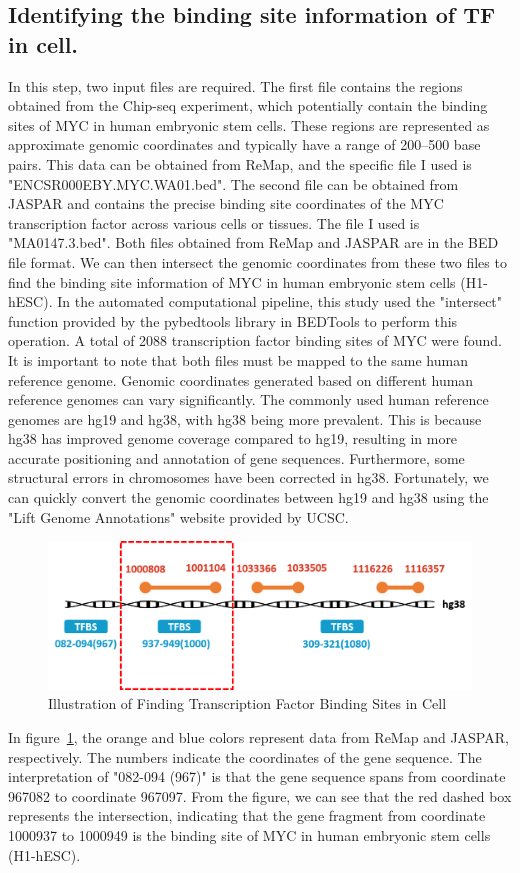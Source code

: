 \documentclass{PHlab-thesis}
\begin{document}
\subsection[Finding TFBSs]{Identifying the binding site information of TF in cell.}
In this step, two input files are required. The first file contains the regions obtained from the Chip-seq experiment, which potentially contain the binding sites of MYC in human embryonic stem cells. These regions are represented as approximate genomic coordinates and typically have a range of 200--500 base pairs. This data can be obtained from ReMap, and the specific file I used is "ENCSR000EBY.MYC.WA01.bed". The second file can be obtained from JASPAR and contains the precise binding site coordinates of the MYC transcription factor across various cells or tissues. The file I used is "MA0147.3.bed". Both files obtained from ReMap and JASPAR are in the BED file format. We can then intersect the genomic coordinates from these two files to find the binding site information of MYC in human embryonic stem cells (H1-hESC). In the automated computational pipeline, this study used the "intersect" function provided by the pybedtools library in BEDTools to perform this operation. A total of 2088 transcription factor binding sites of MYC were found.
It is important to note that both files must be mapped to the same human reference genome. Genomic coordinates generated based on different human reference genomes can vary significantly. The commonly used human reference genomes are hg19 and hg38, with hg38 being more prevalent. This is because hg38 has improved genome coverage compared to hg19, resulting in more accurate positioning and annotation of gene sequences. Furthermore, some structural errors in chromosomes have been corrected in hg38. Fortunately, we can quickly convert the genomic coordinates between hg19 and hg38 using the "Lift Genome Annotations" website provided by UCSC.
\begin{figure}[H]
	\centering
	\includegraphics[scale=0.6]{figures/findTFBSs.png}
	\caption{Illustration of Finding Transcription Factor Binding Sites in Cell }
	\label{fig:findTFBSs} %
\end{figure}
In figure~\ref{fig:findTFBSs}, the orange and blue colors represent data from ReMap and JASPAR, respectively. The numbers indicate the coordinates of the gene sequence. The interpretation of "082-094 (967)" is that the gene sequence spans from coordinate 967082 to coordinate 967097. From the figure, we can see that the red dashed box represents the intersection, indicating that the gene fragment from coordinate 1000937 to 1000949 is the binding site of MYC in human embryonic stem cells (H1-hESC).
\end{document}
